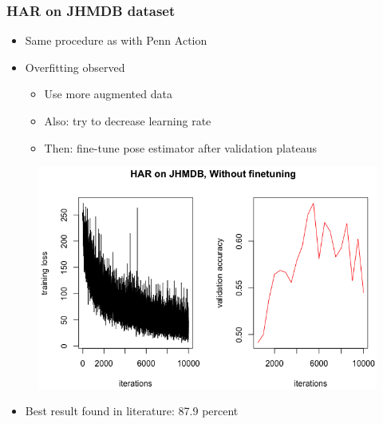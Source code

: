 \documentclass[9pt]{beamer}
\newenvironment{myframe}[1][]{%
\begin{frame}%
\frametitle{#1}
\setcounter{footnote}{0}


}{%
\end{frame}%
}
\begin{document}
\begin{myframe}[HAR on JHMDB dataset]
    \begin{itemize}
        \item Same procedure as with Penn Action
        \item Overfitting observed
        \begin{itemize}
            \item Use more augmented data
            \item Also: try to decrease learning rate
            \item Then: fine-tune pose estimator after validation plateaus
        \end{itemize}
    \end{itemize}
    \begin{figure}
        \includegraphics[height=.55\textheight]{presentation_har_jhmdb_bad.png}
        \centering
    \end{figure}    
    \begin{itemize}
        \item Best result found in literature: 87.9 percent \footnotemark
    \end{itemize}
\end{myframe}
\end{document}
